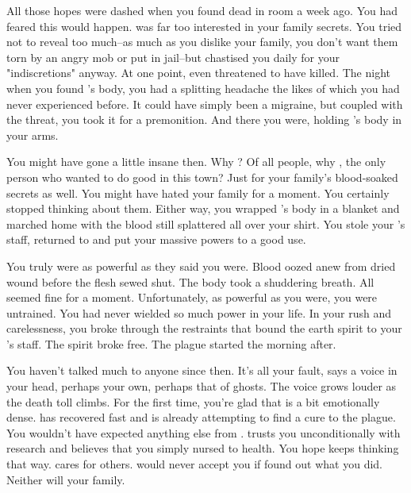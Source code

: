 \documentclass[char]{Pestilence}
\begin{document}
All those hopes were dashed when you found \cOutsider{} dead in \cOutsider{\their} room a week ago. You had feared this would happen. \cOutsider{} was far too interested in your family secrets. You tried not to reveal too much--as much as you dislike your family, you don't want them torn by an angry mob or put in jail--but \cApprentice{} chastised you daily for your "indiscretions" anyway. At one point, \cApprentice{\they} even threatened to have \cOutsider{} killed. The night when you found \cOutsider{}'s body, you had a splitting headache the likes of which you had never experienced before. It could have simply been a migraine, but coupled with the threat, you took it for a premonition. And there you were, holding \cOutsider{}'s body in your arms.

You might have gone a little insane then. Why \cOutsider{\them}? Of all people, why \cOutsider{}, the only person who wanted to do good in this town? Just for your family's blood-soaked secrets as well. You might have hated your family for a moment. You certainly stopped thinking about them. Either way, you wrapped \cOutsider{}'s body in a blanket and marched home with the blood still splattered all over your shirt. You stole your \cElder{\parent}'s staff, returned to \cOutsider{} and put your massive powers to a good use.

You truly were as powerful as they said you were. Blood oozed anew from dried wound before the flesh sewed shut. The body took a shuddering breath. All seemed fine for a moment. Unfortunately, as powerful as you were, you were untrained. You had never wielded so much power in your life. In your rush and carelessness, you broke through the restraints that bound the earth spirit to your \cElder{\parent}'s staff. The spirit broke free. The plague started the morning after.

You haven't talked much to anyone since then. It's all your fault, says a voice in your head, perhaps your own, perhaps that of ghosts. The voice grows louder as the death toll climbs. For the first time, you're glad that \cOutsider{} is a bit emotionally dense. \cOutsider{\They} has recovered fast and is already attempting to find a cure to the plague. You wouldn't have expected anything else from \cOutsider{\them}. \cOutsider{\They} trusts you unconditionally with \cOutsider{\their} research and believes that you simply nursed \cOutsider{\them} to health. You hope \cOutsider{\they} keeps thinking that way. \cOutsider{} cares for others. \cOutsider{\They} would never accept you if \cOutsider{\they} found out what you did. Neither will your family.
\end{document}
